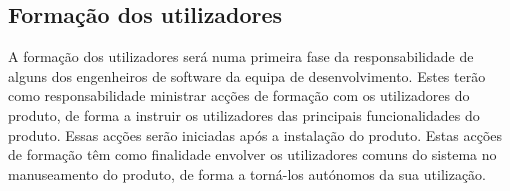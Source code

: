 \subsection{Formação dos utilizadores}
A formação dos utilizadores será numa primeira fase da responsabilidade de alguns dos engenheiros de software da equipa de desenvolvimento. Estes terão como responsabilidade ministrar acções de formação com os utilizadores do produto, de forma a instruir os utilizadores das principais funcionalidades do produto. Essas acções serão iniciadas após a instalação do produto. Estas acções de formação têm como finalidade envolver os utilizadores comuns do sistema no manuseamento do produto, de forma a torná-los autónomos da sua utilização.
